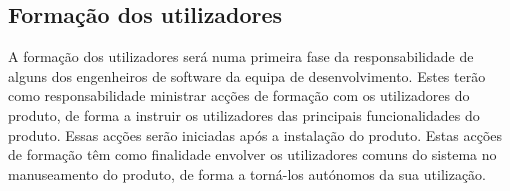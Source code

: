 \subsection{Formação dos utilizadores}
A formação dos utilizadores será numa primeira fase da responsabilidade de alguns dos engenheiros de software da equipa de desenvolvimento. Estes terão como responsabilidade ministrar acções de formação com os utilizadores do produto, de forma a instruir os utilizadores das principais funcionalidades do produto. Essas acções serão iniciadas após a instalação do produto. Estas acções de formação têm como finalidade envolver os utilizadores comuns do sistema no manuseamento do produto, de forma a torná-los autónomos da sua utilização.
